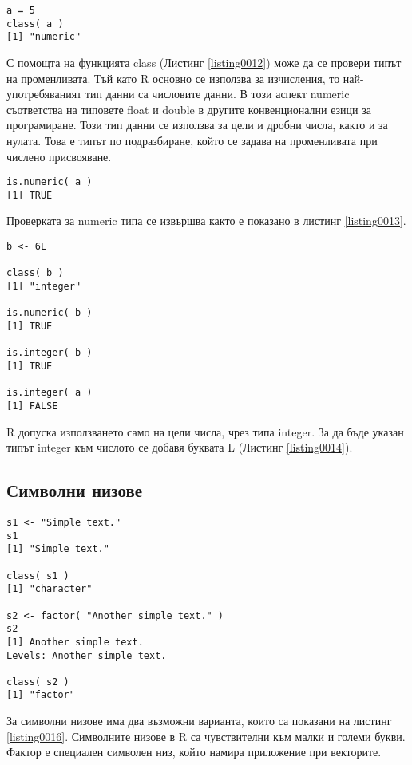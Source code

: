 \begin{lstlisting}[caption=Проверка за типа на променливата, label=listing0012]
a = 5
class( a )
[1] "numeric"
\end{lstlisting}

С помощта на функцията class (Листинг \ref{listing0012}) може да се провери типът на променливата. Тъй като R основно се използва за изчисления, то най-употребяваният тип данни са числовите данни. В този аспект numeric съответства на типовете float и double в другите конвенционални езици за програмиране. Този тип данни се използва за цели и дробни числа, както и за нулата. Това е типът по подразбиране, който се задава на променливата при числено присвояване.

\begin{lstlisting}[caption=Проверка за типа numeric, label=listing0013]
is.numeric( a )
[1] TRUE
\end{lstlisting}

Проверката за numeric типа се извършва както е показано в листинг \ref{listing0013}.

\begin{lstlisting}[caption=Използване на целочислен тип, label=listing0014]
b <- 6L

class( b )
[1] "integer"

is.numeric( b )
[1] TRUE

is.integer( b )
[1] TRUE

is.integer( a )
[1] FALSE
\end{lstlisting}

R допуска използването само на цели числа, чрез типа integer. За да бъде указан типът integer към числото се добавя буквата L (Листинг \ref{listing0014}).

\subsection{Символни низове}

\begin{lstlisting}[caption=Символни низове в R, label=listing0016]
s1 <- "Simple text."
s1
[1] "Simple text."

class( s1 )
[1] "character"

s2 <- factor( "Another simple text." )
s2
[1] Another simple text.
Levels: Another simple text.

class( s2 )
[1] "factor"
\end{lstlisting}

За символни низове има два възможни варианта, които са показани на листинг \ref{listing0016}. Символните низове в R са чувствителни към малки и големи букви. Фактор е специален символен низ, който намира приложение при векторите.

